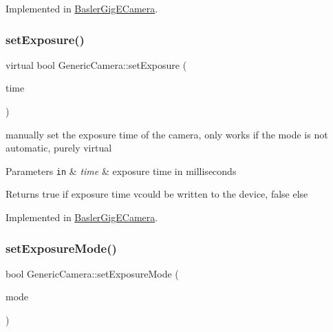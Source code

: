 Implemented in \hyperlink{class_basler_gig_e_camera_aa7e8cde9ecc7b2375146f41a6e35840e}{Basler\+Gig\+E\+Camera}.

\mbox{\label{class_generic_camera_a62365678e9254bde587de4a50ffb7887}} 
\subsubsection{\texorpdfstring{set\+Exposure()}{setExposure()}}
{\footnotesize\ttfamily virtual bool Generic\+Camera\+::set\+Exposure (\begin{DoxyParamCaption}\item[{const double}]{time }\end{DoxyParamCaption})\hspace{0.3cm}{\ttfamily [pure virtual]}}

manually set the exposure time of the camera, only works if the mode is not automatic, purely virtual 
\begin{DoxyParams}[1]{Parameters}
\mbox{\tt in}  & {\em time} & exposure time in milliseconds \\
\hline
\end{DoxyParams}
\begin{DoxyReturn}{Returns}
true if exposure time vcould be written to the device, false else 
\end{DoxyReturn}


Implemented in \hyperlink{class_basler_gig_e_camera_a99f9cd699aac5cb1025cb7086fbba7c0}{Basler\+Gig\+E\+Camera}.

\mbox{\label{class_generic_camera_a5c3bd3ca0d691cf9026f8c91b3cf7c66}} 
\subsubsection{\texorpdfstring{set\+Exposure\+Mode()}{setExposureMode()}}
{\footnotesize\ttfamily bool Generic\+Camera\+::set\+Exposure\+Mode (\begin{DoxyParamCaption}\item[{\hyperlink{constants_8h_a6e920987695b1da6e2df4e41dc867e18}{Exposure\+Modes}}]{mode }\end{DoxyParamCaption})\hspace{0.3cm}{\ttfamily [pure virtual]}}

